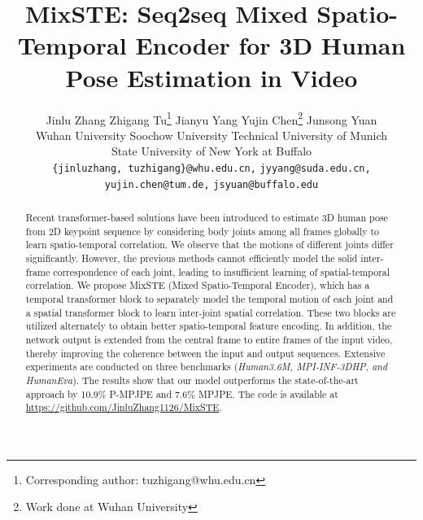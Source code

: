 \documentclass[10pt,twocolumn,letterpaper]{article}
\begin{document}
	
\title{MixSTE: Seq2seq Mixed Spatio-Temporal Encoder for 3D Human Pose Estimation in Video}
	
	\author{
    Jinlu Zhang \qquad
    Zhigang Tu\thanks{Corresponding author: tuzhigang@whu.edu.cn}\qquad 
    Jianyu Yang\qquad
    Yujin Chen\thanks{Work done at Wuhan University}\qquad
    Junsong Yuan \\
	Wuhan University\qquad
	Soochow University\qquad
	Technical University of Munich\qquad\\
	State University of New York at Buffalo\\
    {\tt\small \{jinluzhang, tuzhigang\}@whu.edu.cn,}
    {\tt\small jyyang@suda.edu.cn,}
    {\tt\small yujin.chen@tum.de,}
    {\tt\small jsyuan@buffalo.edu}
}



	\maketitle
	
\begin{abstract}
Recent transformer-based solutions have been introduced to estimate 3D human pose from 2D keypoint sequence by considering body joints among all frames globally to learn spatio-temporal correlation.
		We observe that the motions of different joints differ significantly.
		However, the previous methods cannot efficiently model the solid inter-frame correspondence of each joint, leading to insufficient learning of spatial-temporal correlation.
		We propose MixSTE (Mixed Spatio-Temporal Encoder), which has a temporal transformer block to separately model the temporal motion of each joint and a spatial transformer block to learn inter-joint spatial correlation.
		These two blocks are utilized alternately to obtain better spatio-temporal feature encoding.
		In addition, the network output is extended from the central frame to entire frames of the input video, thereby improving the coherence between the input and output sequences.
		Extensive experiments are conducted on three benchmarks (\ie \textit{Human3.6M, MPI-INF-3DHP, and HumanEva}).
		The results show that our model outperforms the state-of-the-art approach by 10.9\% P-MPJPE and 7.6\% MPJPE. 
		The code is available at {\url{https://github.com/JinluZhang1126/MixSTE}}.
		




	\end{abstract}
	
\end{document}
